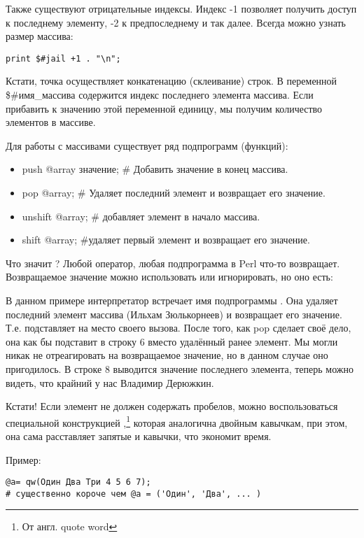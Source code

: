 Также существуют отрицательные индексы. Индекс -1 позволяет получить 
доступ к последнему элементу, -2 к предпоследнему и так далее. Всегда можно 
узнать размер массива:

\begin{verbatim}
print $#jail +1 . "\n";
\end{verbatim}

Кстати, точка осуществляет конкатенацию (склеивание) строк. В переменной 
\$\#имя\_массива содержится индекс последнего элемента массива. Если 
прибавить к значению этой переменной единицу, мы получим количество 
элементов в массиве.

Для работы с массивами существует ряд подпрограмм (функций):

\begin{itemize}
\item push @array значение; \# Добавить значение в конец массива.
\item pop @array;           \# Удаляет последний элемент и возвращает его значение.
\item unshift @array;       \# добавляет элемент в начало массива.
\item shift @array;         \#удаляет первый элемент и возвращает его значение.
\end{itemize}

Что значит  ? Любой оператор, любая подпрограмма в
Perl что-то возвращает. Возвращаемое значение можно использовать или
игнорировать, но оно есть:


В данном примере интерпретатор встречает имя подпрограммы . Она 
удаляет последний элемент массива (Ильхам Зюлькорнеев) и возвращает его 
значение. Т.е. подставляет на место своего вызова. После того, как pop 
сделает своё дело, она как бы подставит в строку 6 вместо  
удалённый ранее элемент. Мы могли никак не отреагировать на возвращаемое 
значение, но в данном случае оно пригодилось. В строке 8 выводится 
значение последнего элемента, теперь можно видеть, что крайний у нас 
Владимир Дерюжкин.

Кстати! Если элемент не должен содержать пробелов, можно воспользоваться 
специальной конструкцией ,\footnote{От англ. quote word} которая аналогична двойным кавычкам, 
при этом, она сама расставляет запятые и кавычки, что экономит время.

Пример:

\begin{verbatim}
@a= qw(Один Два Три 4 5 6 7);
# существенно короче чем @a = ('Один', 'Два', ... )
\end{verbatim}

